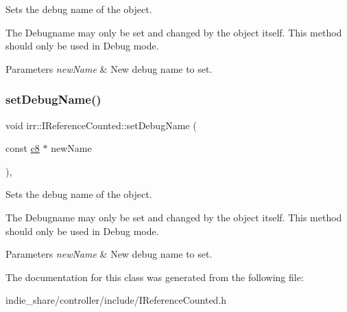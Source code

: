 Sets the debug name of the object. 

The Debugname may only be set and changed by the object itself. This method should only be used in Debug mode. 
\begin{DoxyParams}{Parameters}
{\em new\+Name} & New debug name to set. \\
\hline
\end{DoxyParams}
\mbox{\label{classirr_1_1IReferenceCounted_a704c5042d399fe8cd3bdd65a0559002a}} 
\subsubsection{\texorpdfstring{set\+Debug\+Name()}{setDebugName()}\hspace{0.1cm}{\footnotesize\ttfamily [2/2]}}
{\footnotesize\ttfamily void irr\+::\+I\+Reference\+Counted\+::set\+Debug\+Name (\begin{DoxyParamCaption}\item[{const \hyperlink{namespaceirr_a9395eaea339bcb546b319e9c96bf7410}{c8} $\ast$}]{new\+Name }\end{DoxyParamCaption})\hspace{0.3cm}{\ttfamily [inline]}, {\ttfamily [protected]}}



Sets the debug name of the object. 

The Debugname may only be set and changed by the object itself. This method should only be used in Debug mode. 
\begin{DoxyParams}{Parameters}
{\em new\+Name} & New debug name to set. \\
\hline
\end{DoxyParams}


The documentation for this class was generated from the following file\+:\begin{DoxyCompactItemize}
\item 
indie\+\_\+share/controller/include/I\+Reference\+Counted.\+h\end{DoxyCompactItemize}
